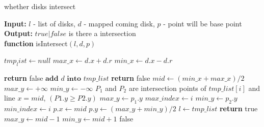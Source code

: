 \documentclass[10pt, conference, compsocconf]{IEEEtran}
\begin{document}
\begin{algorithm}
    \caption{whether disks intersect}
    \begin{flushleft}
        \textbf{Input:} $l$ - list of disks, $d$ - mapped coming disk, $p$ - point will be base point\\
        \textbf{Output:} $true|false$  is there a intersection\\
        \textbf{function} isIntersect$(l, d, p)$
    \end{flushleft}
    \begin{algorithmic}[1]
        \State $tmp_list \gets null$
        \State $max\_x\gets d.x+d.r$
        \State $min\_x\gets d.x-d.r$

                \State \textbf{return} false
            \EndIf
        \EndFor
        \State $\textbf{add } d \textbf{ into } tmp\_list$
            \State \textbf{return} false
        \EndIf
            \State $mid \gets (min\_x + max\_x)/2$
            \State $max\_y \gets +\infty$
            \State $min\_y \gets -\infty$
                \State $P_1$ and $P_2$ are intersection points of $tmp\_list[i]$ and line $x=mid$, $(P1.y\geqslant P2.y)$
                    \State $max\_y \gets p_1.y$
                    \State $max\_index \gets i$
                \EndIf
                    \State $min\_y \gets p_2.y$
                    \State $min\_index \gets i$
                \EndIf
            \EndFor
                \State $p.x \gets mid$
                \State $p.y \gets (max\_y+min\_y)/2$
                \State $l \gets tmp\_list$
                \State \textbf{return} true
            \EndIf
                \State $max\_y \gets mid-1$
                \State $min\_y \gets mid+1$
            \EndIf
        \EndWhile
        \Return false
    \end{algorithmic}
\end{algorithm}
\end{document}
